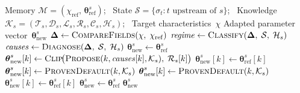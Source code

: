 \documentclass[a4paper,fleqn]{cas-dc}
\begin{document}
{\begin{algorithm}[ht]
\caption{\hl{Stage-agent parameter adaptation for stage~$s$.}}\label{alg:stage-adapt}
\begin{algorithmic}[1]
\Require Memory $\mathcal{M} = (\chi_{\mathrm{ref}},\,\boldsymbol{\theta}_{\mathrm{ref}}^{s})$; \, State $\mathcal{S} = \{\sigma_t : t \text{ upstream of } s\}$; \, Knowledge $\mathcal{K}_s = (\mathcal{T}_s, \mathcal{D}_s, \mathcal{L}_s, \mathcal{R}_s, \mathcal{C}_s, \mathcal{H}_s)$; \, Target characteristics~$\chi$
\Ensure Adapted parameter vector~$\boldsymbol{\theta}_{\mathrm{new}}^{s}$
\Statex {}
\State $\boldsymbol{\Delta} \gets \textsc{CompareFields}(\chi,\;\chi_{\mathrm{ref}})$
\Statex {}
\State $\mathit{regime} \gets \textsc{Classify}(\boldsymbol{\Delta},\;\mathcal{S},\;\mathcal{H}_s)$
\State $\mathit{causes} \gets \textsc{Diagnose}(\boldsymbol{\Delta},\;\mathcal{S},\;\mathcal{H}_s)$
\Statex {}
\State $\boldsymbol{\theta}_{\mathrm{new}}^{s} \gets \boldsymbol{\theta}_{\mathrm{ref}}^{s}$ 
 
        \State $\boldsymbol{\theta}_{\mathrm{new}}^{s}[k] \gets \textsc{Clip}\!\bigl(\textsc{Propose}(k,\mathit{causes}[k],\mathcal{K}_s),\;\mathcal{R}_s[k]\bigr)$
        \State $\boldsymbol{\theta}_{\mathrm{new}}^{s}[k] \gets \boldsymbol{\theta}_{\mathrm{ref}}^{s}[k]$
    \Else
        \State $\boldsymbol{\theta}_{\mathrm{new}}^{s}[k] \gets \textsc{ProvenDefault}(k,\mathcal{K}_s)$
    \EndIf
\EndFor
{} $\boldsymbol{\theta}_{\mathrm{new}}^{s}[k] \gets \textsc{ProvenDefault}(k,\mathcal{K}_s)$ 
\EndFor
{} $\boldsymbol{\theta}_{\mathrm{new}}^{s}[k] \gets \boldsymbol{\theta}_{\mathrm{ref}}^{s}[k]$ 
\EndFor
\Statex {}
    \State $\boldsymbol{\theta}_{\mathrm{new}}^{s} \gets \boldsymbol{\theta}_{\mathrm{ref}}^{s}$ 
\EndIf
\Statex {}
\State \Return $\boldsymbol{\theta}_{\mathrm{new}}^{s}$
\end{algorithmic}
\end{algorithm}

}
\end{document}
